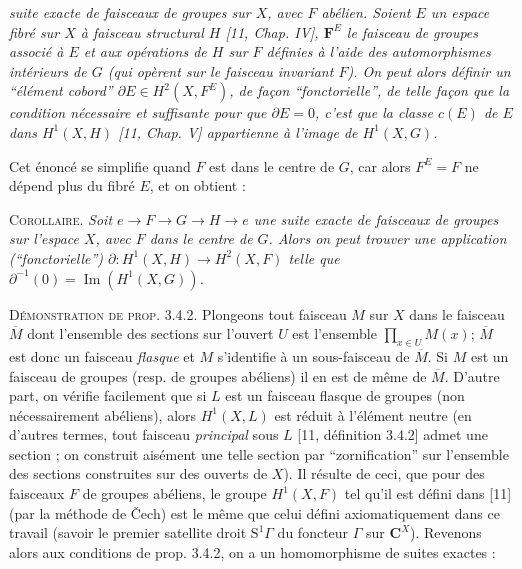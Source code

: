 
\noindent\textit{suite exacte de faisceaux de groupes sur $X$, avec $F$ abélien.
Soient $E$ un espace fibré sur $X$ à faisceau structural $H$ \textup{[11,} Chap. IV\textup{]},
$\mathbf F^E$ le faisceau de groupes associé à $E$ et aux opérations de $H$ sur $F$
définies à l'aide des automorphismes intérieurs de $G$ \textup{(}qui opèrent sur le
faisceau invariant $F$\textup{)}. On peut alors définir un ``élément cobord''
$\partial E\in H^2(X,F^E)$, de façon ``fonctorielle'', de telle façon que
la condition nécessaire et suffisante pour que $\partial E=0$, c'est que la
classe $c(E)$ de $E$ dans $H^1(X,H)$ \textup{[11,} Chap. V\textup{]} appartienne à l'image de
$H^1(X,G)$.}

Cet énoncé se simplifie quand $F$ est dans le centre de $G$, car alors
$F^E=F$ ne dépend plus du fibré $E$, et on obtient :

\indent\textsc{Corollaire.} \textit{Soit
$e\to F\to G\to H\to e$
une suite exacte de faisceaux de groupes sur l'espace $X$, avec $F$ dans le
centre de $G$. Alors on peut trouver une application \textup{(}``fonctorielle''\textup{)}
$\partial:H^1(X,H)\to H^2(X,F)$
telle que $\partial^{-1}(0)=\operatorname{Im}(H^1(X,G))$.}

\indent\textsc{Démonstration de prop. 3.4.2.} Plongeons tout faisceau $M$ sur $X$
dans le faisceau $\overline M$ dont l'ensemble des sections sur l'ouvert $U$
est l'ensemble
$\displaystyle\prod_{x\in U}M(x)$;
$\overline M$ est donc un faisceau \textit{flasque} et $M$ s'identifie à un
sous-faisceau de $\overline M$. Si $M$ est un faisceau de groupes (resp. de
groupes abéliens) il en est de même de $\overline M$. D'autre part, on vérifie
facilement que si $L$ est un faisceau flasque de groupes (non nécessairement
abéliens), alors $H^1(X,L)$ est réduit à l'élément neutre (en d'autres termes,
tout faisceau \textit{principal} sous $L$ [11, définition 3.4.2] admet une
section ; on construit aisément une telle section par ``zornification''
sur l'ensemble des sections construites sur des ouverts de $X$).
Il résulte de ceci, que pour des faisceaux $F$ de groupes abéliens, le groupe
$H^1(X,F)$ tel qu'il est défini dans [11] (par la méthode de Čech) est le même
que celui défini axiomatiquement dans ce travail (savoir le premier satellite
droit $\mathrm S^1\Gamma$ du foncteur $\Gamma$ sur $\mathbf C^X$). Revenons alors aux
conditions de prop. 3.4.2, on a un homomorphisme de suites exactes :

